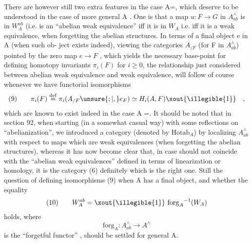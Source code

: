 There are however still two  extra features in the case A=\hand{$\Delta$}, which
deserve to be understood in the case of more general A . One is that
a map $u\colon F\to G$ in $A^{\wedge}_{ab}$ is in $W^{ab}_A$ (i.e. is an ``abelian weak equivalence''\hand{\unsure{)}}
iff it is in $W_A$ i.e. iff it is a weak equivalence, when forgetting the
abelian structures. In terms of a final object e in A (when such ob-%
ject exists indeed), viewing the categories $A_{/F}$ (for F in $A^{\wedge}_{ab}$) pointed 
by the zero map $e \to F$ , which yields the necessary base-point  for
defining homotopy invariants $\pi_i(F)$ for $i \geqslant 0$, the relationship just
considered between abelian weak equivalence and weak equivalence, will
follow of course whenever we have functorial isomorphisms
\[ (9) \qquad \pi_i(F) \overset{\mathrm{def}}{=} \pi_i(A_{/F} \unsure{;|,} e_F) \simeq H_i(A,F) \xout{\illegible{1}} \quad , \]
which are known to exist indeed in the case A =\hand{$\Delta$}. It should be noted
that in section 92, when starting (in a somewhat casual way) with some
reflections on ``abelianization'', we introduced a category (denoted
by $\mathrm{Hotab}_A$) by localizing $A^{\wedge}_{ab}$ with respect to  maps which are weak
equivalences (when forgetting the abelian structures), whereas it has
now become clear that, in case   should not coincide with
the  ``abelian weak equivalences'' defined in terms of linearization
or homology, it is the category (6) definitely which is the right one.
Still the question of defining isomorphisms (9) when A has a final
object, and whether the equality
\[ (10) \qquad W^{ab}_A = \xout{\illegible{1}} \ \mathrm{forg}_A{}^{-1}(W_A) \]
holds, where
\[ \mathrm{forg}_A\colon A^{\wedge}_{ab} \longrightarrow A^{\wedge} \]
is the ``forgetful functor'' , should be settled for general A.

